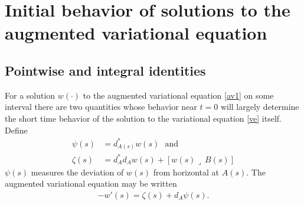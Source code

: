 \documentclass[12pt]{article}
\def \eref{\eqref}
\def \lrc{\lrcorner\,}
\numberwithin{equation}{section}
\begin{document}
\section{Initial behavior of solutions to the augmented variational equation} \label{secibw}


\subsection{Pointwise and integral identities} \label{secids}


 For a solution $w(\cdot)$ to the augmented variational equation \eref{av1}
on some interval there are two quantities  whose behavior near $t =0$ will largely determine
 the short time behavior of the solution to the variational equation \eref{ve} itself. Define 
\begin{align}
\psi(s) &= d_{A(s)}^* w(s)\ \ \ \text{and}                     \label{ib10psi} \\
\zeta(s) &= d_A^*d_A w(s) + [w(s)\lrc B(s)] \label{ib549}
\end{align}
$\psi(s)$ measures the deviation of $w(s)$ from horizontal at $A(s)$. The augmented variational equation
may be written
\begin{align}
-w'(s) = \zeta(s) + d_A\psi(s)    \label{ib10av}.
\end{align}
 
 
\end{document}
